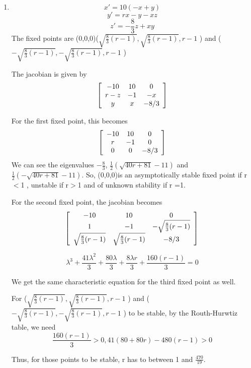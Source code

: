 \documentclass[a4paper]{article}
\newenvironment{mat}{\left[ \begin{array}{ccccccccccccc}}{\end{array}\right]}
\newcommand\bcm{\begin{mat}}
\newcommand\ecm{\end{mat}}
\begin{document}
\begin{enumerate}
\vspace{90mm}
\item 
\[ x' = 10(-x+y) \]
\[ y' = rx -y -xz \]
\[ z' = -\frac{8}{3}z +xy\]
The fixed points are (0,0,0)($\sqrt{\frac{8}{3}(r-1)},\sqrt{\frac{8}{3}(r-1)},r-1$ )
and ($-\sqrt{\frac{8}{3}(r-1)},-\sqrt{\frac{8}{3}(r-1)},r-1$ )

The jacobian is given by 
\[\bcm -10 & 10 & 0\\r-z &-1 &-x \\ y &x &-8/3 \ecm \]

For the first fixed point, this becomes
\[\bcm -10 & 10 & 0\\r &-1 & 0 \\ 0 &0  &-8/3 \ecm \]
We can see the eigenvalues $-\frac{8}{3}$, $\frac{1}{2}(\sqrt{40r+81}-11)$ and  $\frac{1}{2}(-\sqrt{40r+81}-11)$. So, (0,0,0)is an asymptotically stable fixed point if r $<$1 , unstable if r$>$1 and of unknown stability if r =1.


For the second  fixed point, the jacobian becomes
\[\bcm -10 & 10 & 0\\1 &-1 &-\sqrt{\frac{8}{3}(r-1)} \\ \sqrt{\frac{8}{3}(r-1)} &\sqrt{\frac{8}{3}(r-1)} &-8/3 \ecm \]

\[\lambda^3 + \frac{41 \lambda^2}{3} + \frac{80 \lambda}{3} + \frac{8 \lambda r}{3} + \frac{160 (r-1)}{3}  =0\]

We get the same characteristic equation for the third fixed point as well.

For ($\sqrt{\frac{8}{3}(r-1)},\sqrt{\frac{8}{3}(r-1)},r-1$ )
and ($-\sqrt{\frac{8}{3}(r-1)},-\sqrt{\frac{8}{3}(r-1)},r-1$ ) to be stable, by the Routh-Hurwtiz table, we need
\[\frac{160(r-1)}{3}>0, 41(80+80r)-480(r-1)>0   \]

Thus, for those points to be stable, r has to between 1 and $\frac{470}{19}$. 



\end{enumerate}
\end{document}
